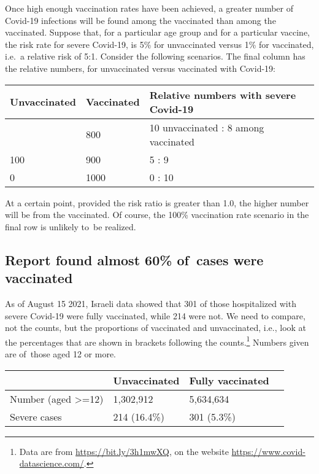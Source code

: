 \documentclass[
  10ptls,
  b5paper]{book}
\begin{document}
Once high enough vaccination rates have been achieved, a greater number of Covid-19 infections will be found among the vaccinated than among the vaccinated. Suppose that, for a particular age group and for a particular vaccine, the risk rate for severe Covid-19, is 5\% for unvaccinated versus 1\% for vaccinated, i.e.~a relative risk of 5:1. Consider the following scenarios. The final column has the relative numbers, for unvaccinated versus vaccinated with Covid-19:

\begin{longtable}[]{@{}lll@{}}
\toprule\noalign{}
Unvaccinated & Vaccinated & Relative numbers with severe Covid-19 \\
\midrule\noalign{}
\endhead
\bottomrule\noalign{}
\endlastfoot
200 & 800 & 10 unvaccinated : 8 among vaccinated \\
100 & 900 & 5 : 9 \\
0 & 1000 & 0 : 10 \\
\end{longtable}

At a certain point, provided the risk ratio is greater than 1.0, the higher number will be from the vaccinated. Of course, the 100\% vaccination rate scenario in the final row is unlikely to~be realized.

\subsection*{Report found almost 60\% of~cases were vaccinated}\label{report-found-almost-60-of-cases-were-vaccinated}

As of August 15 2021, Israeli data showed that 301 of those hospitalized with severe Covid-19 were fully vaccinated, while 214 were not. We need to compare, not the counts, but the proportions of vaccinated and unvaccinated, i.e., look at the percentages that are shown in brackets following the counts.\footnote{Data are from \url{https://bit.ly/3h1mwXQ}, on the website \url{https://www.covid-datascience.com/}.} Numbers given are of~those aged 12 or more.

\begin{longtable}[]{@{}llll@{}}
\toprule\noalign{}
& Unvaccinated & Fully vaccinated & \\
\midrule\noalign{}
\endhead
\bottomrule\noalign{}
\endlastfoot
Number (aged \textgreater=12) & 1,302,912 & 5,634,634 & \\
Severe cases & 214 (16.4\%) & 301 (5.3\%) & \\
\end{longtable}
\end{document}

